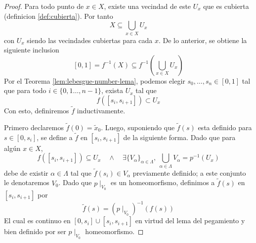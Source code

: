 \begin{proof}
  Para todo punto de \(x \in X\), existe una vecindad de este \(U_x\)
  que es cubierta (definicion \ref{def:cubierta}). Por tanto
  \[ X \subseteq \bigcup_{x \in X} U_x\]
  con \(U_x\) siendo las vecindades cubiertas para cada \(x\). De lo
  anterior, se obtiene la siguiente inclusion
  \[ [0,1] = f^{-1} \left( X \right) \subseteq f^{-1} \left( \bigcup_{x
    \in X} U_x \right) \]
  Por el Teorema \ref{lem:lebesgue-number-lema}, podemos elegir
  \(s_0,\dotsc,s_n \in [0,1]\) tal que para todo \(i \in \{0,1 \dotsc,
  n-1\}\), exista \(U_x\) tal que
  \[f \left( [s_i, s_{i+1}] \right) \subset U_x \]
  Con esto, definiremos \(\tilde f\) inductivamente.

  Primero declaremos \(\tilde f (0) = \tilde x _0\). Luego, suponiendo
  que \(\tilde f (s)\) esta definido para \(s \in [0, s_i]\), se
  define a \(\tilde f \) en \([s_i, s_{i+1}]\) de la siguiente forma.
  Dado que para algún \(x \in X\),
  \[
    f \left( [s_i, s_{i+1}] \right) \subseteq U_x \quad \land \quad
    \exists \{V_\alpha\}_{\alpha \in \Lambda},\ \bigcup_{\alpha \in \Lambda}
    V_\alpha = p^{-1} (U_x)
  \]
  debe de existir \(\alpha \in \Lambda\) tal que \(\tilde f (s_i) \in
  V_\alpha\) previamente definido; a este conjunto le denotaremos
  \(V_0\). Dado que \(p \mid_{V_0}\) es un homeomorfismo, definimos a
  \(\tilde f (s)\) en \([s_i, s_{i+1}]\) por
  \begin{equation} \label{eq:tilde-f-inductiva}
    \tilde f (s) = \left( p \mid _{V_0} \right)^{-1} \left( f(s) \right)
  \end{equation}
  El cual es continuo en \([0, s_i] \cup [s_i, s_{i+1}]\) en virtud del
  lema del pegamiento y bien definido por ser \( p \mid _{V_0} \)
  homeomorfismo.


\end{proof}
